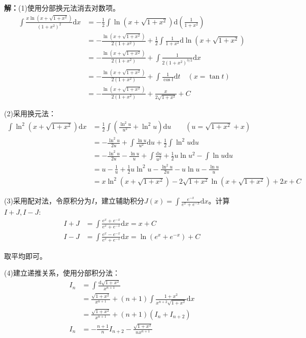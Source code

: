 \documentclass{ctexart}
\let\oldtextbf\textbf %
\renewcommand{\textbf}[1]{\textcolor{btex}{\oldtextbf{#1}}} %
\begin{document}
\textbf{解：}(1)使用分部换元法消去对数项。
\begin{align*}
    \int\frac{x\ln(x+\sqrt{1+x^2})}{(1+x^2)^2}\mathrm{d}x&=-\frac{1}{2}\int\ln (x+\sqrt{1+x^2})\mathrm{d}(\frac{1}{1+x^2})\\
    &=-\frac{\ln(x+\sqrt{1+x^2})}{2(1+x^2)}+\frac{1}{2}\int\frac{1}{1+x^2}\mathrm{d}\ln(x+\sqrt{1+x^2})\\
    &=-\frac{\ln(x+\sqrt{1+x^2})}{2(1+x^2)}+\int\frac{1}{2(1+x^2)^{3/2}}\mathrm{d}x \\
&=-\frac{\ln(x+\sqrt{1+x^2})}{2(1+x^2)}+\int\frac{1}{\cos t}\mathrm{d}t \quad(x=\tan t) \\
&=-\frac{\ln(x+\sqrt{1+x^2})}{2(1+x^2)}+\frac{x}{2\sqrt{1+x^2}}+C 
\end{align*}

(2)采用换元法：
\begin{align*}
  \int \ln^2(x+\sqrt{1+x^2})\mathrm{d}x&=\frac{1}{2}\int(\frac{\ln^2 u}{u^2}+\ln^2u)\mathrm{d}u\qquad (u=\sqrt{1+x^2}+x)\\
&=-\frac{\ln^2 u}{2u}+\int\frac{\ln u}{u^2}\mathrm{d}u+\frac{1}{2}\int \ln^2 u\mathrm{d}u\\
&=-\frac{\ln^2 u}{2u}-\frac{\ln u}{u} +\int  \frac{\mathrm{d}u }{u^2}+\frac{1}{2}u\ln u^2-\int \ln u\mathrm{d}u\\
&=u-\frac{1}{u}+\frac{1}{2}u\ln^2 u-\frac{\ln^2u}{2u}-u\ln u-\frac{\ln u}{u}\\
&=x\ln^2(x+\sqrt{1+x^2})-2\sqrt{1+x^2}\ln(x+\sqrt{1+x^2})+2x+C         
\end{align*}

(3)采用配对法，令原积分为$I$，建立辅助积分$J(x)=\int \frac{e^{-x}}{e^x+e^{-x}}\mathrm{d}x$。计算$I+J,I-J$:
\begin{align*}
I+J&=\int\frac{e^x+e^{-x}}{e^x+e^{-x}}\mathrm{d}x=x+C\\
I-J&=\int\frac{e^{x}-e^{-x}}{e^{x}+e^{-x}}\mathrm{d}x=\ln(e^x+e^{-x})+C
\end{align*}

取平均即可。

(4)建立递推关系，使用分部积分法：
\begin{align*}
I_n&=\int\frac{\mathrm{d}\sqrt{1+x^2}}{x^{n+1}}\\
&=\frac{\sqrt{1+x^2}}{x^{n+1}}+(n+1)\int\frac{1+x^2}{x^{n+2}\sqrt{1+x^2}}\mathrm{d}x\\
&= \frac{\sqrt{1+x^2}}{x^{n+1}}+(n+1)(I_n+I_{n+2})\\
I_n&=-\frac{n+1}{n}I_{n+2}-\frac{\sqrt{1+x^2}}{nx^{n+1}} 
\end{align*}
\end{document}
